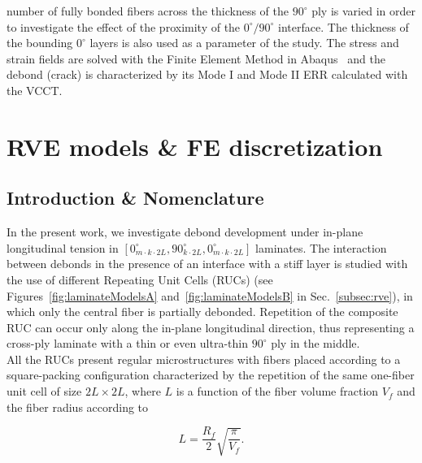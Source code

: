 \documentclass[review]{elsarticle}
\begin{document}
number of fully bonded fibers across the thickness of the $90^{\circ}$ ply is varied in order to investigate the effect of the proximity of the $0^{\circ}/90^{\circ}$ interface. The thickness of the bounding $0^{\circ}$ layers is also used as a parameter of the study. The stress and strain fields are solved with the Finite Element Method in Abaqus~\cite{abq12} and the debond (crack) is characterized by its Mode I and Mode II ERR calculated with the VCCT.


\section{RVE models \& FE discretization}


\subsection{Introduction \& Nomenclature}\label{subsec:names}

In the present work, we investigate debond development under in-plane longitudinal tension in $\left[0_{m\cdot k\cdot2L}^{\circ},90_{k\cdot2L}^{\circ},0_{m\cdot k\cdot2L}^{\circ}\right]$ laminates. The interaction between debonds in the presence of an interface with a stiff layer is studied with the use of different Repeating Unit Cells (RUCs)  (see Figures~\ref{fig:laminateModelsA} and~\ref{fig:laminateModelsB} in Sec.~\ref{subsec:rve}), in which only the central fiber is partially debonded. Repetition of the composite RUC can occur only along the in-plane longitudinal direction, thus representing a cross-ply laminate with a thin or even ultra-thin $90^{\circ}$ ply in the middle.\\
All the RUCs present regular microstructures with fibers placed according to a square-packing configuration characterized by the repetition of the same one-fiber unit cell of size $2L\times2L$, where $L$ is a function of the fiber volume fraction $V_{f}$ and the fiber radius according to

\begin{equation}\label{eq:LVf}
L=\frac{R_{f}}{2}\sqrt{\frac{\pi}{V_{f}}}.
\end{equation}
\end{document}
